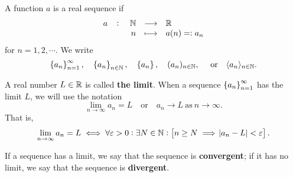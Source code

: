 \documentclass[11pt,openany]{article}
\begin{document}
\vfill
{}
\begin{remark*}
A function $a$ is a real sequence if \[
\fullfunction{a}{\N}{\R}{n}{a(n)=:a_n}
\] for $n=1,2,\cdots$. We write \[
\set{a_n}_{n=1}^\infty,\quad \set{a_n}_{n\in\N},\quad\set{a_n},\quad (a_n)_{n\in\N},\quad\ \text{or}\quad \gen{a_n}_{n\in\N}.
\]
\end{remark*}
\begin{remark*}
	A real number $L\in\mathbb{R}$ is called \textbf{the limit}. When a sequence $\set{a_n}_{n=1}^\infty$ has the limit $L$, we will use the notation \[
	\lim_{n\to\infty}a_n=L\quad\text{or}\quad a_n\to L\ \text{as}\ n\to\infty.
	\]  That is, \[
		\lim_{n\to\infty}a_n=L\iff \forall\varepsilon>0:\exists N\in\mathbb{N}:\left[ n\geq N\implies \abs{a_n-L}<\varepsilon\right].
	\]
\end{remark*}

\newpage
\begin{note}
	If a sequence has a limit, we say that the sequence is \textbf{convergent}; if it has no limit, we say that the sequence is \textbf{divergent}.
\end{note}
\end{document}
